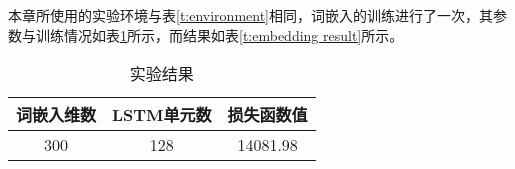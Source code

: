 本章所使用的实验环境与表\ref{t:environment}相同，词嵌入的训练进行了一次，其参数与训练情况如表\ref{t:embedding train}所示，而结果如表\ref{t:embedding result}所示。

\begin{table}[h]
	\caption{实验结果}
	\label{t:embedding train}
	\vspace{0.5em}\centering\wuhao
	\begin{tabular}{ccc}
		\toprule[1.5pt]
		词嵌入维数 & LSTM单元数 & 损失函数值 \\
		\midrule[1pt]
		300 & 128 & 14081.98 \\
		\bottomrule[1.5pt]
	\end{tabular}
\end{table}

\begin{comment}
\begin{table}[h]
\caption{实验结果}
\label{t:embedding result}
\vspace{0.5em}\centering\wuhao
\begin{tabular}{ccc}
	\toprule[1.5pt]
	相似度函数 & 词嵌入矩阵 & Spearman等级相关系数 \\
	\midrule[1pt]
	$\text{sim}_\text{c}$ & $E$ & 0.3860 \\
	$\text{sim}_\text{c}$ & $E'$ &  0.3542 \\
	$\text{sim}_\text{c}$ & $E + E'$ & 0.3756 \\
	$\text{sim}_\text{e}$ & $E$ &  0.2017 \\
	$\text{sim}_\text{e}$ & $E'$ & 0.0304 \\
	$\text{sim}_\text{e}$ & $E + E'$ & 0.0943 \\
	\bottomrule[1.5pt]
\end{tabular}
\end{table}

\begin{table}[h]
	\caption{实验结果}
	\vspace{0.5em}\centering\wuhao
	\begin{tabular}{cccc}
		\toprule[1.5pt]
		\diagbox{相似度函数}{相关系数}{词嵌入矩阵} & $E$ & $E'$ & $E + E'$ \\
		\midrule[1pt]
		$\text{sim}_\text{c}$ & 0.3860 & 0.3542 & 0.3756 \\
		$\text{sim}_\text{e}$ & 0.2017 & 0.0304 & 0.0943 \\
		\bottomrule[1.5pt]
	\end{tabular}
\end{table}
\end{comment}

